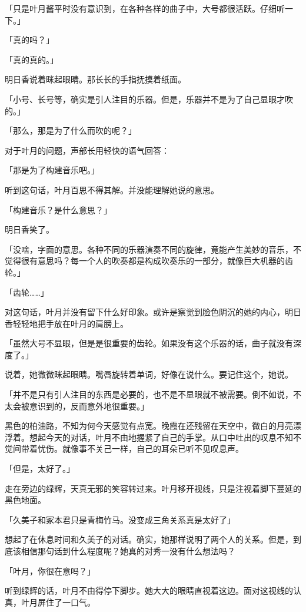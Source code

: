 \documentclass[UTF8]{ctexart}
\begin{document}
    「只是叶月酱平时没有意识到，在各种各样的曲子中，大号都很活跃。仔细听一下。」

    「真的吗？」

    「真的真的。」

    明日香说着眯起眼睛。那长长的手指抚摸着纸面。

    「小号、长号等，确实是引人注目的乐器。但是，乐器并不是为了自己显眼才吹的。」

    「那么，那是为了什么而吹的呢？」

    对于叶月的问题，声部长用轻快的语气回答：

    「那是为了构建音乐吧。」

    听到这句话，叶月百思不得其解。并没能理解她说的意思。

    「构建音乐？是什么意思？」

    明日香笑了。

    「没啥，字面的意思。各种不同的乐器演奏不同的旋律，竟能产生美妙的音乐，不觉得很有意思吗？每一个人的吹奏都是构成吹奏乐的一部分，就像巨大机器的齿轮。」

    「齿轮……」

    对这句话，叶月并没有留下什么好印象。或许是察觉到脸色阴沉的她的内心，明日香轻轻地把手放在叶月的肩膀上。

    「虽然大号不显眼，但是是很重要的齿轮。如果没有这个乐器的话，曲子就没有深度了。」

    说着，她微微眯起眼睛。嘴唇旋转着单词，好像在说什么。要记住这个，她说。

    「并不是只有引人注目的东西是必要的，也不是不显眼就不被需要。倒不如说，不太会被意识到的，反而意外地很重要。」

    黑色的柏油路，不知为何今天感觉有点宽。晚霞在还残留在天空中，微白的月亮漂浮着。想起今天的对话，叶月不由地握紧了自己的手掌。从口中吐出的叹息不知不觉间带着忧伤。就像事不关己一样，自己的耳朵已听不见叹息声。

    「但是，太好了。」

    走在旁边的绿辉，天真无邪的笑容转过来。叶月移开视线，只是注视着脚下蔓延的黑色地面。

    「久美子和冢本君只是青梅竹马。没变成三角关系真是太好了」

    想起了在休息时间和久美子的对话。确实，她那样说明了两个人的关系。但是，到底该相信那句话到什么程度呢？她真的对秀一没有什么想法吗？

    「叶月，你很在意吗？」

    听到绿辉的话，叶月不由得停下脚步。她大大的眼睛直视着这边。面对这视线的认真，叶月屏住了一口气。
\end{document}

